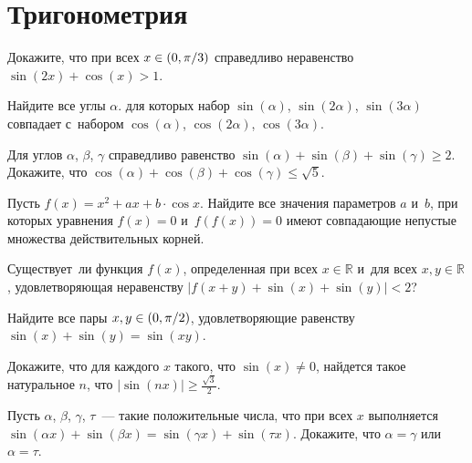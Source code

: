 
\section*{Тригонометрия}


\begingroup \def\piconst{\mathrm{\pi}}

\begin{problems}

\item
Докажите, что при всех $x \in (0, \piconst / 3)$ справедливо неравенство
\(
    \sin(2 x) + \cos(x) > 1
\).

\item
Найдите все углы $\alpha$. для которых набор
$\sin(\alpha)$, $\sin(2 \alpha)$, $\sin(3 \alpha)$ совпадает с~набором
$\cos(\alpha)$, $\cos(2 \alpha)$, $\cos(3 \alpha)$.

\item
Для углов $\alpha$, $\beta$, $\gamma$ справедливо равенство
\(
    \sin(\alpha) + \sin(\beta) + \sin(\gamma)
\geq
    2
\).
Докажите, что
\(
    \cos(\alpha) + \cos(\beta) + \cos(\gamma)
\leq
    \sqrt{5}
\).

\item
Пусть $f(x) = x^2 + a x + b \cdot \cos{x}$.
Найдите все значения параметров $a$ и~$b$, при которых уравнения
$f(x) = 0$ и~$f(f(x)) = 0$ имеют совпадающие непустые множества действительных
корней.

\item
Существует~ли функция $f(x)$, определенная при всех $x \in \mathbb{R}$
и~для всех $x, y \in \mathbb{R}$, удовлетворяющая неравенству
\(
    \lvert f(x + y) + \sin(x) + \sin(y) \rvert
<
    2
\)?

\item
Найдите все пары $x, y \in (0, \piconst / 2)$, удовлетворяющие равенству
\(
    \sin(x) + \sin(y) = \sin(x y)
\).

\item
Докажите, что для каждого $x$ такого, что $\sin(x) \neq 0$, найдется
такое натуральное $n$, что
\(
    \lvert \sin(nx) \rvert
\geq
    \frac{\sqrt{3}}{2}
\).

\item
Пусть $\alpha$, $\beta$, $\gamma$, $\tau$~--- такие положительные
числа, что при всех $x$ выполняется
\(
    \sin(\alpha x) + \sin(\beta x)
=
    \sin(\gamma x) + \sin(\tau x)
\).
Докажите, что $\alpha = \gamma$ или $\alpha = \tau$.


\end{problems}
